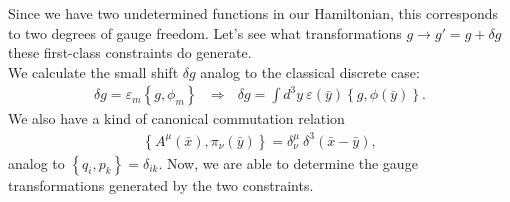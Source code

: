 \label{sec:electrodynamics_transformations}
Since we have two undetermined functions in our Hamiltonian, this corresponds to two degrees of gauge freedom.
Let's see what transformations $g \longrightarrow g' = g + \delta g$ these first-class constraints do generate. \\
We calculate the small shift $\delta g$ analog to the classical discrete case:
\begin{align}
\delta g = \varepsilon_m \left\{ g,\phi_m \right\} \ \ \ \Longrightarrow \ \ \ \delta g = \int d^3 y \ \varepsilon(\bar{y}) \left\{ g,\phi(\bar{y}) \right\}.
\end{align}
We also have a kind of canonical commutation relation
\begin{align}
\left\{ A^{\mu}(\bar{x}), \pi_{\nu}(\bar{y}) \right\} = \delta_{\nu}^{\mu} \ \delta^3(\bar{x} - \bar{y}),
\end{align}
analog to $\left\{ q_i, p_k \right\} = \delta_{ik}$. Now, we are able to determine the gauge transformations generated by the two constraints. 

